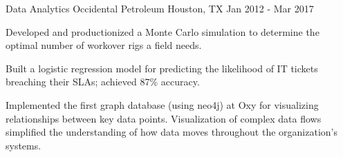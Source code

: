 \begin{cventries}

\cventry
{Data Analytics} %
{Occidental Petroleum} %
{Houston, TX} %
{Jan 2012 - Mar 2017} %
{ %
\begin{cvitems}
\item {Developed and productionized a Monte Carlo simulation to determine the optimal number of workover rigs a field needs.}
\item {Built a logistic regression model for predicting the likelihood of IT tickets breaching their SLAs; achieved 87\% accuracy.}
\item {Implemented the first graph database (using neo4j) at Oxy for visualizing relationships between key data points. Visualization of 
        complex data flows simplified the understanding of how data moves throughout the organization's systems.}
\end{cvitems}
}


\end{cventries}